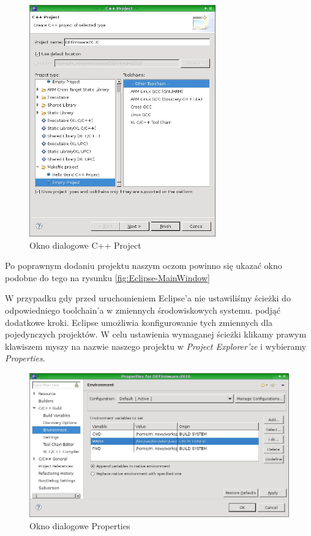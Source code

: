 \begin{figure}[ht!]
 \centering
 \includegraphics[height=100.0mm]{../images/ch03/Eclipse-CPP-Project.jpg}
 \caption{Okno dialogowe C++ Project}
 \label{fig:Eclipse-CPP-Project}
\end{figure}

Po poprawnym dodaniu projektu naszym oczom powinno się ukazać okno podobne do
tego na rysunku \ref{fig:Eclipse-MainWindow}

W przypadku gdy przed uruchomieniem Eclipse'a nie ustawiliśmy ścieżki do
odpowiedniego toolchain'a w zmiennych środowiskowych systemu. podjąć dodatkowe
kroki. Eclipse umożliwia konfigurowanie tych zmiennych dla pojedynczych
projektów. W celu ustawienia wymaganej ścieżki klikamy prawym klawiszem myszy na
nazwie naszego projektu w \textit{Project Explorer'ze} i wybieramy
\textit{Properties}.

\begin{figure}[ht!]
 \centering
 \includegraphics[width=150.0mm]{../images/ch03/Eclipse-Project-Properties.jpg}
 \caption{Okno dialogowe Properties}
 \label{fig:Eclipse-Project-Properties}
\end{figure}

